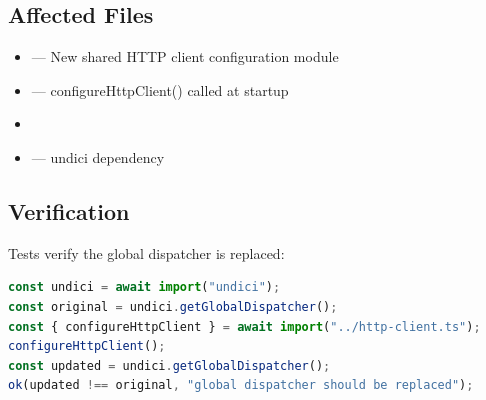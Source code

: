 \subsection*{Affected Files}
\begin{itemize}
    \item {} — New shared HTTP client configuration module
    \item {} — configureHttpClient() called at startup
    \item {}
    \item {} — undici dependency
\end{itemize}

\subsection*{Verification}
Tests verify the global dispatcher is replaced:

\begin{lstlisting}[language=TypeScript]
const undici = await import("undici");
const original = undici.getGlobalDispatcher();
const { configureHttpClient } = await import("../http-client.ts");
configureHttpClient();
const updated = undici.getGlobalDispatcher();
ok(updated !== original, "global dispatcher should be replaced");
\end{lstlisting}
